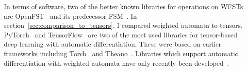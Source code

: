 In terms of software, two of the better known libraries for operations on WFSTs
are OpenFST~\citep{mohri2000design} and its predecessor
FSM~\citep{allauzen2007openfst}. In section~\ref{sec:comparison_to_tensors}, I
compared weighted automata to tensors. PyTorch~\citep{paszke2019pytorch} and
TensorFlow~\citep{abadi2016tensorflow} are two of the most used libraries for
tensor-based deep learning with automatic differentiation. These were based on
earlier frameworks including Torch~\citep{collobert2011torch7} and
Theano~\citep{bergstra2010theano}. Libraries which support automatic
differentiation with weighted automata have only recently been
developed~\citep{k2, hannun2020differentiable}.
